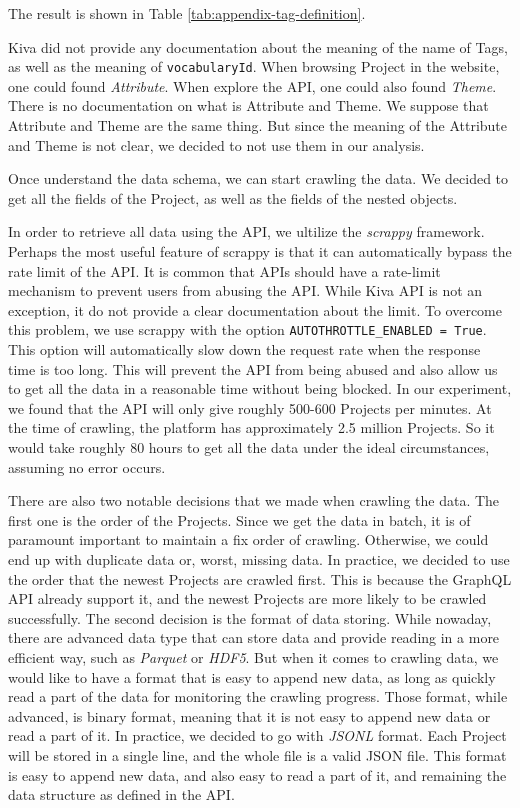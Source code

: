The result is shown in Table \ref{tab:appendix-tag-definition}.


Kiva did not provide any documentation about the meaning of the name of Tags,
as well as the meaning of \lstinline|vocabularyId|.
When browsing Project in the website, one could found \textit{Attribute}.
When explore the API, one could also found \textit{Theme}.
There is no documentation on what is Attribute and Theme.
We suppose that Attribute and Theme are the same thing.
But since the meaning of the Attribute and Theme is not clear,
we decided to not use them in our analysis.

Once understand the data schema, we can start crawling the data.
We decided to get all the fields of the Project, as well as the fields of the nested objects.

In order to retrieve all data using the API, we ultilize the \textit{scrappy}\parencite{scrappy} framework.
Perhaps the most useful feature of scrappy is that it can automatically bypass the rate limit of the API.
It is common that APIs should have a rate-limit mechanism to prevent users from abusing the API.
While Kiva API is not an exception, it do not provide a clear documentation about the limit.
To overcome this problem, we use scrappy with the option \lstinline|AUTOTHROTTLE_ENABLED = True|.
This option will automatically slow down the request rate when the response time is too long.
This will prevent the API from being abused and also allow us to get all the data in a reasonable time without being blocked.
In our experiment, we found that the API will only give roughly 500-600 Projects per minutes.
At the time of crawling, the platform has approximately 2.5 million Projects.
So it would take roughly 80 hours to get all the data under the ideal circumstances, assuming no error occurs.

There are also two notable decisions that we made when crawling the data.
The first one is the order of the Projects.
Since we get the data in batch, it is of paramount important to maintain a fix order of crawling.
Otherwise, we could end up with duplicate data or, worst, missing data.
In practice, we decided to use the order that the newest Projects are crawled first.
This is because the GraphQL API already support it, and the newest Projects are more likely to be crawled successfully.
The second decision is the format of data storing.
While nowaday, there are advanced data type that can store data and provide reading in a more efficient way,
such as \textit{Parquet}\parencite{parquet} or \textit{HDF5}\parencite{hdf5}.
But when it comes to crawling data, we would like to have a format that is easy to append new data,
as long as quickly read a part of the data for monitoring the crawling progress.
Those format, while advanced, is binary format, meaning that it is not easy to append new data or read a part of it.
In practice, we decided to go with \textit{JSONL} format.
Each Project will be stored in a single line, and the whole file is a valid JSON file.
This format is easy to append new data, and also easy to read a part of it, and remaining the data structure as defined in the API.

